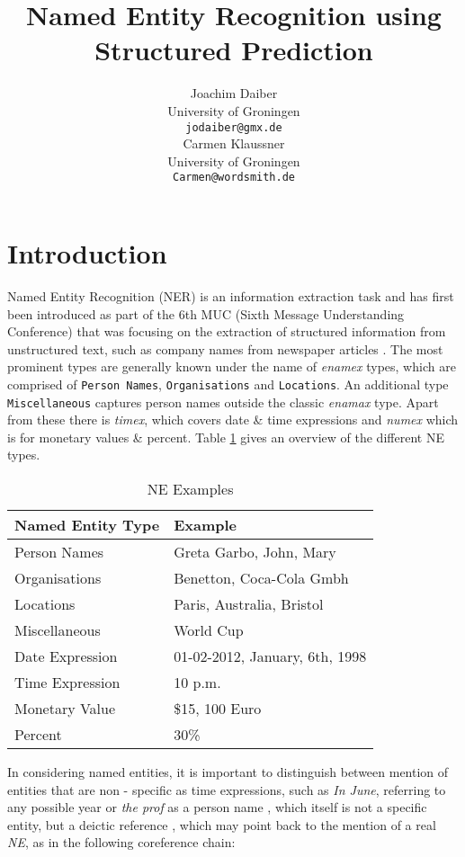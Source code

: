 \documentclass[11pt]{article}
\title{Named Entity Recognition using Structured Prediction}
\author{Joachim Daiber \\
  University of Groningen \\
  {\tt jodaiber@gmx.de} \\\And
  Carmen Klaussner \\
  University of Groningen \\
  {\tt Carmen@wordsmith.de} \\}
\date{}
\begin{document}
\maketitle

\section{Introduction}
Named Entity Recognition (NER) is an information extraction task and has first been introduced as part of the 6th MUC (Sixth Message Understanding Conference)
that was focusing on the extraction of structured information from unstructured text, such as company names from newspaper articles \cite{nadeau2007survey}.
The most prominent types are generally known under the name of \emph{enamex} types, which are comprised of \texttt{Person Names}, \texttt{Organisations} and \texttt{Locations}. 
An additional type \texttt{Miscellaneous} captures person names outside the classic \emph{enamax} type.
Apart from these there is \emph{timex}, which covers date \& time expressions and \emph{numex} which is for monetary values \& percent. 
Table \ref{table:NETypes} gives an overview of the different NE types.

\begin{table}[h!]
\scriptsize
\begin{tabular}{l|l}
\hline
\bf Named Entity Type & \bf Example \\
\hline
Person Names & Greta Garbo, John, Mary \\
Organisations& Benetton, Coca-Cola Gmbh\\
Locations&  Paris, Australia, Bristol\\
Miscellaneous& World Cup\\
 Date Expression& 01-02-2012, January, 6th, 1998 \\
Time Expression & 10 p.m.\\
Monetary Value &  \$15, 100 Euro   \\
Percent &   30\%
\end{tabular}
\caption{NE Examples}
\label{table:NETypes}
\end{table}


In considering named entities, it is important to distinguish between mention of entities that are non - specific as 
time expressions, such as \emph{In June}, referring to any possible year or \emph{the prof} as a person name , which itself is not a specific entity, but a deictic reference
, which may point back to the mention of a real \emph{NE}, as in the following coreference chain: \\
\end{document}
